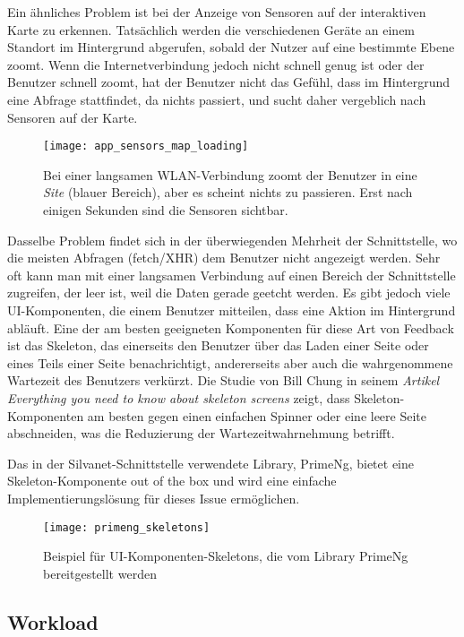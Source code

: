 Ein ähnliches Problem ist bei der Anzeige von Sensoren auf der interaktiven Karte zu erkennen.
Tatsächlich werden die verschiedenen Geräte an einem Standort im Hintergrund abgerufen, sobald der Nutzer auf eine bestimmte Ebene zoomt.
Wenn die Internetverbindung jedoch nicht schnell genug ist oder der Benutzer schnell zoomt, hat der Benutzer nicht das Gefühl, dass im Hintergrund eine Abfrage stattfindet, da nichts passiert, und sucht daher vergeblich nach Sensoren auf der Karte.

\begin{figure}[H]
  \centering
  \texttt{[image: app\_sensors\_map\_loading]}
  \caption{Bei einer langsamen WLAN-Verbindung zoomt der Benutzer in eine \textit{Site} (blauer Bereich), aber es scheint nichts zu passieren. Erst nach einigen Sekunden sind die Sensoren sichtbar.}
  \label{fig:app_sensors_map_loading}
\end{figure}

Dasselbe Problem findet sich in der überwiegenden Mehrheit der Schnittstelle, wo die meisten Abfragen (fetch/\ac{XHR}) dem Benutzer nicht angezeigt werden.
Sehr oft kann man mit einer langsamen Verbindung auf einen Bereich der Schnittstelle zugreifen, der leer ist, weil die Daten gerade geetcht werden.
Es gibt jedoch viele \ac{UI}-Komponenten, die einem Benutzer mitteilen, dass eine Aktion im Hintergrund abläuft.
Eine der am besten geeigneten Komponenten für diese Art von Feedback ist das Skeleton, das einerseits den Benutzer über das Laden einer Seite oder eines Teils einer Seite benachrichtigt, andererseits aber auch die wahrgenommene Wartezeit des Benutzers verkürzt.
Die Studie von Bill Chung in seinem \textit{Artikel Everything you need to know about skeleton screens}\cite{skeletonScreens} zeigt, dass Skeleton-Komponenten am besten gegen einen einfachen Spinner oder eine leere Seite abschneiden, was die Reduzierung der Wartezeitwahrnehmung betrifft.

Das in der Silvanet-Schnittstelle verwendete Library, PrimeNg, bietet eine Skeleton-Komponente out of the box und wird eine einfache Implementierungslösung für dieses Issue ermöglichen.

\begin{figure}[H]
  \centering
  \texttt{[image: primeng\_skeletons]}
  \caption{Beispiel für \ac{UI}-Komponenten-Skeletons, die vom Library PrimeNg bereitgestellt werden}
  \label{fig:primeng_skeletons}
\end{figure}

\subsection{Workload}

